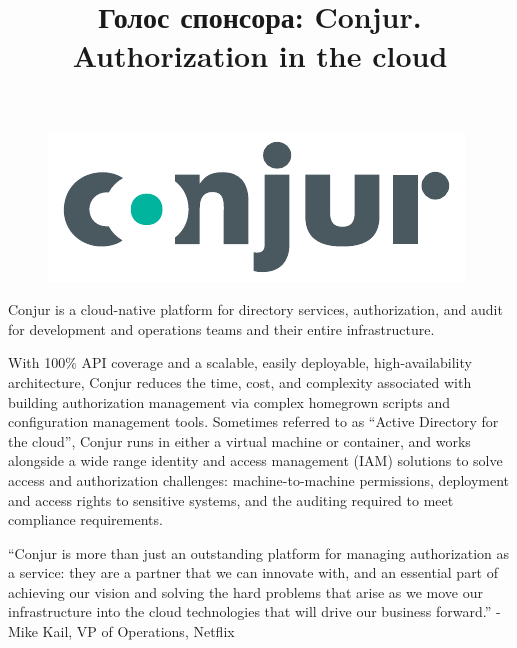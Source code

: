 \documentclass[10pt, a5paper]{article}
\begin{document}
\title{Голос спонсора: Conjur. Authorization in the cloud}
\date{}
\maketitle

\begin{figure}[h!]
\centering
\includegraphics{74_conjur-logo-1.pdf}
\end{figure}

Conjur is a cloud-native platform for directory services, authoriza\-tion, and audit for development and operations teams and their entire infrastructure. 

With 100\% API coverage and a scalable, easily deployable, high-availability architecture, Conjur reduces the time, cost, and complexity associated with building authorization management via complex home\-grown scripts and configuration management tools. Sometimes referred to as “Active Directory for the cloud”, Conjur runs in either a virtual machine or container, and works alongside a wide range identity and access management (IAM) solutions to solve access and authorization challenges: machine-to-machine permissions, deployment and access \linebreak rights to 
sensitive systems, and the auditing required to meet complian\-ce requirements. 

“Conjur is more than just an outstanding platform for managing authorization as a service: they are a partner that we can innovate with, and an essential part of achieving our vision and solving the hard problems that arise as we move our infrastructure into the cloud technologies that will drive our business forward.” 
- Mike Kail, VP of Operations, Netflix 
\end{document}
